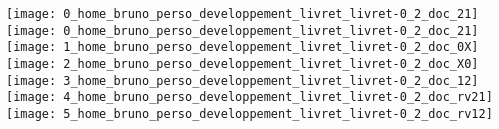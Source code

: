 \documentclass[english]{article}
\begin{document}
\texttt{[image: 0\_home\_bruno\_perso\_developpement\_livret\_livret-0\_2\_doc\_21]}
\clearpage%
\texttt{[image: 0\_home\_bruno\_perso\_developpement\_livret\_livret-0\_2\_doc\_21]}
\clearpage%
\texttt{[image: 1\_home\_bruno\_perso\_developpement\_livret\_livret-0\_2\_doc\_0X]}
\clearpage%
\texttt{[image: 2\_home\_bruno\_perso\_developpement\_livret\_livret-0\_2\_doc\_X0]}
\clearpage%
\texttt{[image: 3\_home\_bruno\_perso\_developpement\_livret\_livret-0\_2\_doc\_12]}
\clearpage%
\texttt{[image: 4\_home\_bruno\_perso\_developpement\_livret\_livret-0\_2\_doc\_rv21]}
\clearpage%
\texttt{[image: 5\_home\_bruno\_perso\_developpement\_livret\_livret-0\_2\_doc\_rv12]}
\clearpage%
\end{document}
